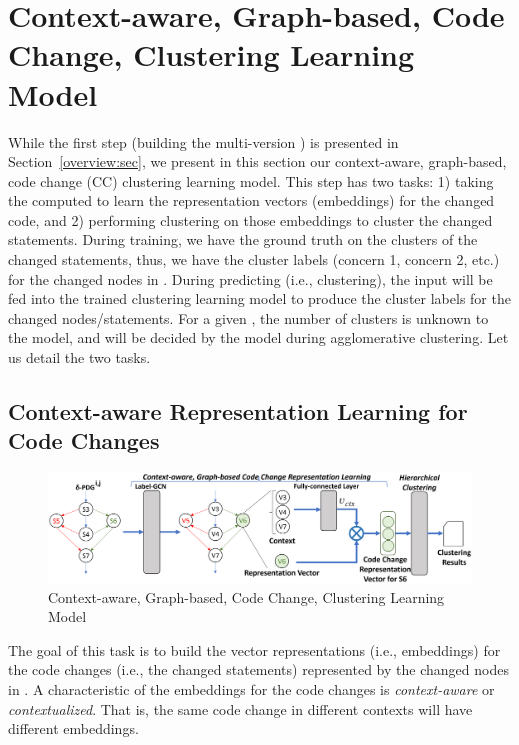 \section{Context-aware, Graph-based, Code Change, Clustering Learning Model}
\label{clustering-model:sec}


While the first step (building the multi-version {\mvpdg}) is
presented in Section~\ref{overview:sec}, we present in this section
our context-aware, graph-based, code change (CC) clustering learning
model.  This step has two tasks: 1) taking the computed {\mvpdg} to
learn the representation vectors (embeddings) for the changed code,
and 2) performing clustering on those embeddings to cluster the
changed statements.  During training, we have the ground truth on the
clusters of the changed statements, thus, we have the cluster labels
(concern 1, concern 2, etc.) for the changed nodes in {\mvpdg}. During
predicting (i.e., clustering), the input {\mvpdg} will be fed into the
trained clustering learning model to produce the cluster labels for
the changed nodes/statements. For a given {\mvpdg}, the number of
clusters is unknown to the model, and will be decided by the model
during agglomerative clustering. Let us detail the two tasks.




\subsection{Context-aware Representation Learning for Code Changes}
\label{vector:sec}

\begin{figure}[t]
	\centering \includegraphics[width=5.8in]{figures/STEP_2-new-2.png}
	\vspace{-6pt}
	\caption{Context-aware, Graph-based, Code Change, Clustering Learning Model}
	\label{fig:step-2}
\end{figure}

The goal of this task is to build the vector representations (i.e.,
embeddings) for the code changes (i.e., the changed statements)
represented by the changed nodes in {\mvpdg}. A characteristic of the
embeddings for the code changes is {\em context-aware} or {\em
  contextualized}. That is, the same code change in different contexts
will have different embeddings.


